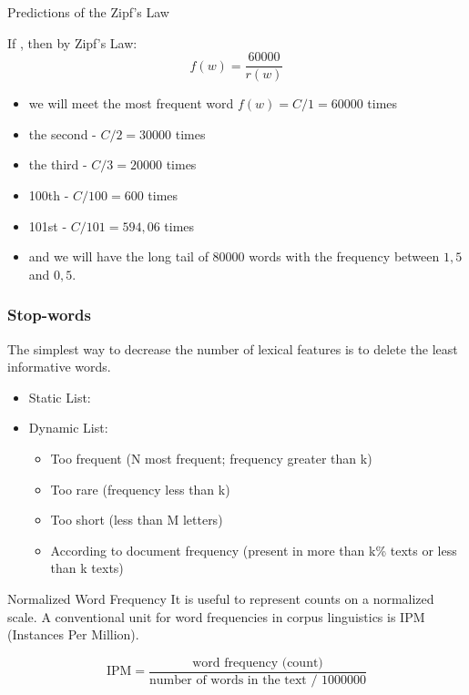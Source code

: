 \documentclass{beamer}
\begin{document}
        \begin{frame}{Predictions of the Zipf's Law}

  If ,  then by Zipf's Law:
  $$
       f(w) = \frac{60000}{r(w)}
  $$
 \begin{itemize}
  \item we will meet the most frequent word $f(w)=C/1=60000$ times
  \item the second - $C/2=30000$ times
  \item the third -  $C/3=20000$ times
  \item 100th - $C/100=600$ times
  \item 101st - $C/101=594,06$ times
  \item and we will have the long tail of 80000 words with the frequency between $1,5$ and $0,5$.
  \end{itemize}
\end{frame}

\begin{frame}
  \frametitle{Stop-words}
  The simplest way to decrease the number of lexical features is to delete the least informative words.

  \begin{itemize}
  \item Static List:

  \item Dynamic List:
    \begin{itemize}
    \item Too frequent (N most frequent; frequency greater than k)
    \item Too rare (frequency less than k)
    \item Too short (less than M letters)
    \item According to document frequency (present in more than k\%
      texts or less than k texts)
    \end{itemize}
  \end{itemize}
\end{frame}

\begin{frame}{Normalized Word Frequency}
 It is useful to represent counts on a normalized scale. A conventional unit for word frequencies in
corpus linguistics is IPM (Instances Per Million).

    $$\text{IPM} = \frac{\text{word frequency (count)}}{\text{number of words in the text / 1000000}}$$
\end{frame}
\end{document}
